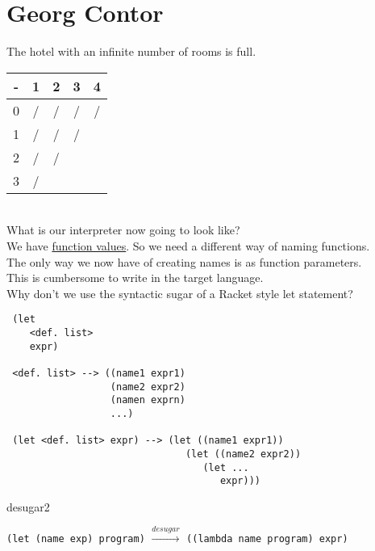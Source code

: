 \documentclass{article}
\begin{document}
\section*{Georg Contor}
\begin{flushleft}
The hotel with an infinite number of rooms is full.\\
\bigskip
\begin{tabular}{c | c c c c}
  - & 1 & 2 & 3 & 4 \\
  \hline
  0 & / & / & / & / \\
  1 & / & / & / &  \\
  2 & / & / &  &  \\
  3 & / &  &  &  \\
\end{tabular}
\bigskip
\\What is our interpreter now going to look like?\\
We have \underline{function values}. So we need a different way of naming functions.\\
The only way we now have of creating names is as function parameters.\\
This is cumbersome to write in the target language.\\
Why don't we use the syntactic sugar of a Racket style let statement?
\pagebreak
\begin{verbatim}
 (let
    <def. list>
    expr)
    
 <def. list> --> ((name1 expr1)
                  (name2 expr2)
                  (namen exprn)
                  ...)
                  
 (let <def. list> expr) --> (let ((name1 expr1))
                               (let ((name2 expr2))
                                  (let ...
                                     expr)))
\end{verbatim}
desugar2

\verb|(let (name exp) program)| $ \xrightarrow{desugar} $ \verb|((lambda name program) expr)| \\


\end{flushleft}
\end{document}

